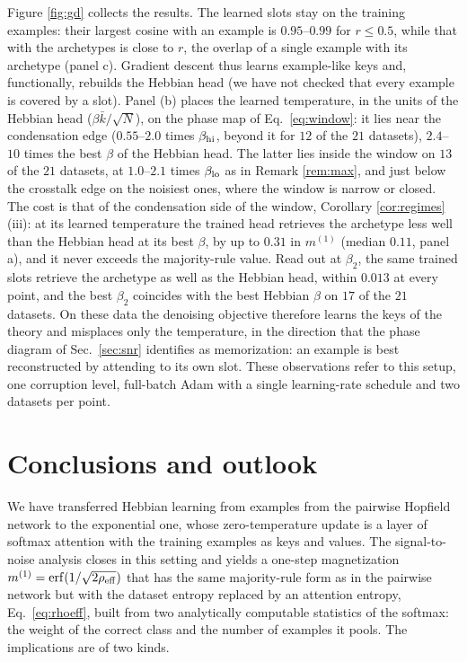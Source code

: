 \documentclass{SciPost}
\theoremstyle{plain}
\theoremstyle{definition}
\newcommand{\erf}{\mathrm{erf}}
\begin{document}
Figure \ref{fig:gd} collects the results. The learned slots stay on the training examples: their largest cosine with an example is $0.95$--$0.99$ for $r\le0.5$, while that with the archetypes is close to $r$, the overlap of a single example with its archetype (panel c). Gradient descent thus learns example-like keys and, functionally, rebuilds the Hebbian head (we have not checked that every example is covered by a slot). Panel (b) places the learned temperature, in the units of the Hebbian head ($\beta\bar k/\sqrt N$), on the phase map of Eq.\ \eqref{eq:window}: it lies near the condensation edge ($0.55$--$2.0$ times $\beta_{\rm hi}$, beyond it for $12$ of the $21$ datasets), $2.4$--$10$ times the best $\beta$ of the Hebbian head. The latter lies inside the window on $13$ of the $21$ datasets, at $1.0$--$2.1$ times $\beta_{\rm lo}$ as in Remark \ref{rem:max}, and just below the crosstalk edge on the noisiest ones, where the window is narrow or closed. The cost is that of the condensation side of the window, Corollary \ref{cor:regimes}(iii): at its learned temperature the trained head retrieves the archetype less well than the Hebbian head at its best $\beta$, by up to $0.31$ in $m^{(1)}$ (median $0.11$, panel a), and it never exceeds the majority-rule value. Read out at $\beta_2$, the same trained slots retrieve the archetype as well as the Hebbian head, within $0.013$ at every point, and the best $\beta_2$ coincides with the best Hebbian $\beta$ on $17$ of the $21$ datasets. On these data the denoising objective therefore learns the keys of the theory and misplaces only the temperature, in the direction that the phase diagram of Sec.\ \ref{sec:snr} identifies as memorization: an example is best reconstructed by attending to its own slot. These observations refer to this setup, one corruption level, full-batch Adam with a single learning-rate schedule and two datasets per point.

\section{Conclusions and outlook}

We have transferred Hebbian learning from examples \cite{Agliari2022concept,Alemanno2023} from the pairwise Hopfield network to the exponential one, whose zero-temperature update is a layer of softmax attention with the training examples as keys and values. The signal-to-noise analysis closes in this setting and yields a one-step magnetization $m^{(1)}=\erf(1/\sqrt{2\rho_{\rm eff}})$ that has the same majority-rule form as in the pairwise network but with the dataset entropy replaced by an attention entropy, Eq.\ \eqref{eq:rhoeff}, built from two analytically computable statistics of the softmax: the weight of the correct class and the number of examples it pools. The implications are of two kinds.
\end{document}
